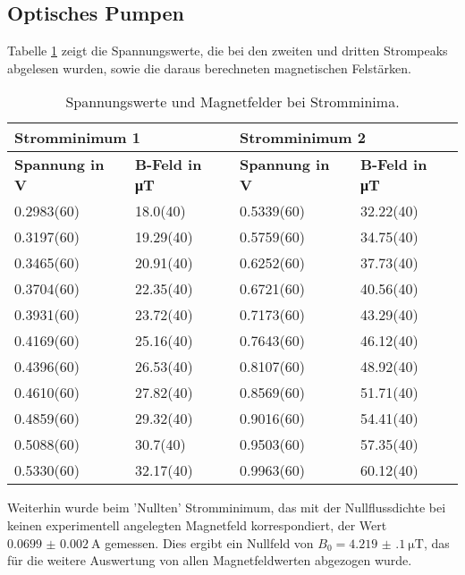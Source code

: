 \documentclass[../main.tex]{subfiles}
\begin{document}
\subsection{Optisches Pumpen}
    Tabelle \ref{tab:PumpenMessdaten} zeigt die Spannungswerte, die bei den zweiten und dritten Strompeaks abgelesen wurden, sowie die daraus berechneten magnetischen Felstärken.

    \begin{table}[H]
        \centering
        \begin{tabular}{l|l|l|l}
            \multicolumn{2}{l|}{\textbf{Stromminimum 1}} & \multicolumn{2}{l}{\textbf{Stromminimum 2}}\\
            \hline
            \textbf{Spannung in V} & \textbf{B-Feld in \si{\micro\tesla}} & \textbf{Spannung in V} & \textbf{B-Feld in \si{\micro\tesla}}\\
            \hline\hline
            0.2983(60) & 18.0(40) & 0.5339(60) & 32.22(40)\\
            \hline
            0.3197(60) & 19.29(40) & 0.5759(60) & 34.75(40)\\
            \hline
            0.3465(60) & 20.91(40) & 0.6252(60) & 37.73(40)\\
            \hline
            0.3704(60) & 22.35(40) & 0.6721(60) & 40.56(40)\\
            \hline
            0.3931(60) & 23.72(40) & 0.7173(60) & 43.29(40)\\
            \hline
            0.4169(60) & 25.16(40) & 0.7643(60) & 46.12(40)\\
            \hline
            0.4396(60) & 26.53(40) & 0.8107(60) & 48.92(40)\\
            \hline
            0.4610(60) & 27.82(40) & 0.8569(60) & 51.71(40)\\
            \hline
            0.4859(60) & 29.32(40) & 0.9016(60) & 54.41(40)\\
            \hline
            0.5088(60) & 30.7(40) & 0.9503(60) & 57.35(40)\\
            \hline
            0.5330(60) & 32.17(40) & 0.9963(60) & 60.12(40)
        \end{tabular}
        \caption{Spannungswerte und Magnetfelder bei Stromminima.}
        \label{tab:PumpenMessdaten}
    \end{table}

    Weiterhin wurde beim 'Nullten' Stromminimum, das mit der Nullflussdichte bei keinen experimentell angelegten Magnetfeld korrespondiert, der Wert $\SI{0.0699(20)}{\ampere}$ gemessen. Dies ergibt ein Nullfeld von $B_0=\SI{ 4.219(100)}{\micro\tesla}$, das für die weitere Auswertung von allen Magnetfeldwerten abgezogen wurde.
\end{document}
